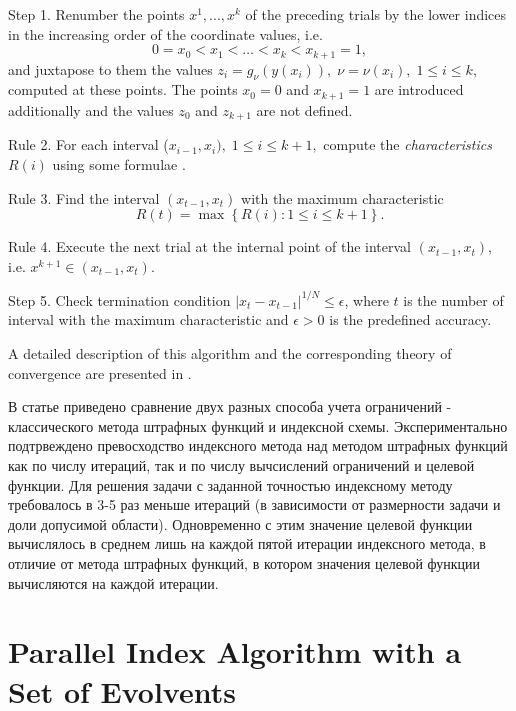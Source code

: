\documentclass[smallextended]{svjour3}       %
\begin{document}
Step 1. Renumber the points $x^1,...,x^k$ of the preceding trials by the lower indices in the increasing order of the coordinate values, i.e.
\[
0=x_0<x_1<\dots <x_k<x_{k+1}=1,
\]
and juxtapose to them the values $z_i=g_\nu(y(x_i)), \; \nu=\nu(x_i), \; 1 \leq i \leq k,$ computed at these points. The points $x_0=0$ and $x_{k+1}=1$ are introduced additionally and the values $z_0$ and $z_{k+1}$ are not defined.

Rule 2. For each interval ($x_{i-1},x_i), \; 1 \leq i \leq k+1,$ compute the \textit{characteristics} $R(i)$ using some formulae \cite{Barkalov2002}.

Rule 3. Find the interval $(x_{t-1},x_t)$ with the maximum characteristic
\begin{equation}\label{MaxR}
R(t)=\max{\left\{R(i): 1 \leq i \leq k+1\right\}}.
\end{equation}

Rule 4. Execute the next trial at the internal point of the interval $(x_{t-1},x_t)$, i.e. $x^{k+1} \in (x_{t-1},x_t)$.

Step 5. Check termination condition $\left|x_t-x_{t-1}\right|^{1/N}\leq \epsilon$, where $t$ is the number of interval with the maximum characteristic and $\epsilon > 0$ is the predefined accuracy.

A detailed description of this algorithm and the corresponding theory of convergence are presented in \cite{Strongin2000,Sergeyev2001,Barkalov2002}.

\Russian
В статье \cite{Barkalov2017} приведено сравнение двух разных способа учета ограничений - классического метода штрафных функций и индексной схемы. Экспериментально подтрвеждено превосходство индексного метода над методом штрафных функций как по числу итераций, так и по числу вычсислений ограничений и целевой функции. Для решения задачи с заданной точностью индексному методу требовалось в 3-5 раз меньше итераций (в зависимости от размерности задачи и доли допусимой области). Одновременно с этим значение целевой функции вычислялось в среднем лишь на каждой пятой итерации индексного метода, в отличие от метода штрафных функций, в котором значения целевой функции вычисляются на каждой итерации.


\section{Parallel Index Algorithm with a Set of Evolvents}
\label{sec:3}
\end{document}

